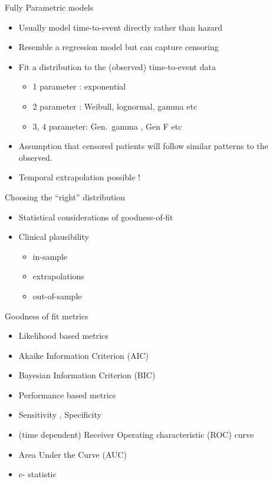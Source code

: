 \documentclass[
  ignorenonframetext,
]{beamer}
\providecommand{\tightlist}{%
  \setlength{\itemsep}{0pt}\setlength{\parskip}{0pt}}
\begin{document}
\begin{frame}{Fully Parametric models}
\protect\hypertarget{fully-parametric-models}{}

\begin{itemize}
\tightlist
\item
  Usually model time-to-event directly rather than hazard
\item
  Resemble a regression model but can capture censoring
\item
  Fit a distribution to the (observed) time-to-event data

  \begin{itemize}
  \tightlist
  \item
    1 parameter : exponential
  \item
    2 parameter : Weibull, lognormal, gamma etc
  \item
    3, 4 parameter: Gen.~gamma , Gen F etc
  \end{itemize}
\item
  Assumption that censored patients will follow similar patterns to the
  observed.
\item
  Temporal extrapolation possible !
\end{itemize}

\end{frame}

\begin{frame}{Choosing the ``right'' distribution}
\protect\hypertarget{choosing-the-right-distribution}{}

\begin{itemize}
\tightlist
\item
  Statistical considerations of goodness-of-fit
\item
  Clinical plausibility

  \begin{itemize}
  \tightlist
  \item
    in-sample
  \item
    extrapolations
  \item
    out-of-sample
  \end{itemize}
\end{itemize}

\end{frame}

\begin{frame}{Goodness of fit metrics}
\protect\hypertarget{goodness-of-fit-metrics}{}

\begin{itemize}
\item
  Likelihood based metrics
\item
  Akaike Information Criterion (AIC)
\item
  Bayesian Information Criterion (BIC)
\item
  Performance based metrics
\item
  Sensitivity , Specificity
\item
  (time dependent) Receiver Operating characteristic (ROC) curve
\item
  Area Under the Curve (AUC)
\item
  c- statistic
\end{itemize}

\end{frame}
\end{document}

